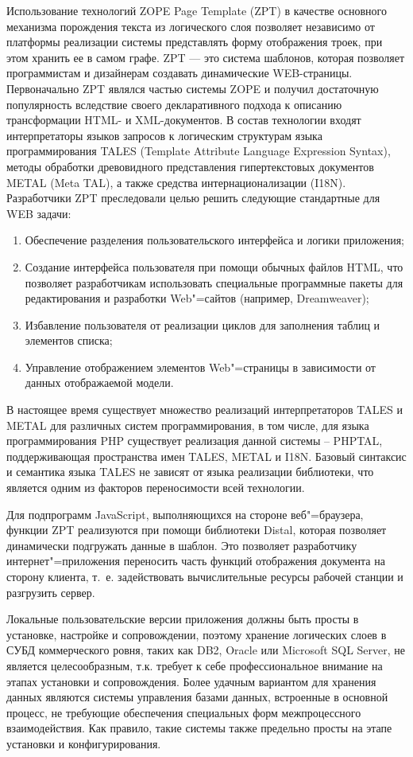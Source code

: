 \documentclass[utf8]{../IncArticle}
\begin{document}
Использование технологий ZOPE Page Template (ZPT) в качестве основного
механизма порождения текста из логического слоя позволяет независимо
от платформы реализации системы представлять форму отображения троек,
при этом хранить ее в самом графе.  ZPT --- это система шаблонов,
которая позволяет программистам и дизайнерам создавать динамические
WEB-страницы.  Первоначально ZPT являлся частью системы ZOPE и получил
достаточную популярность вследствие своего декларативного подхода к
описанию трансформации HTML- и XML-документов.  В состав технологии
входят интерпретаторы языков запросов к логическим структурам языка
программирования TALES (Template Attribute Language Expression
Syntax), методы обработки древовидного представления гипертекстовых
документов METAL (Meta TAL), а также средства интернационализации
(I18N).  Разработчики ZPT преследовали целью решить следующие
стандартные для WEB задачи:
\begin{enumerate}
\item Обеспечение разделения пользовательского интерфейса и логики
  приложения;
\item Создание интерфейса пользователя при помощи обычных файлов
  HTML, что позволяет разработчикам использовать специальные
  программные пакеты для редактирования и разработки Web"=сайтов
  (например, Dreamweaver);
\item Избавление пользователя от реализации циклов для заполнения
  таблиц и элементов списка;
\item Управление отображением элементов Web"=страницы в зависимости от
  данных отображаемой модели.
\end{enumerate}

В настоящее время существует множество реализаций интерпретаторов
TALES и METAL для различных систем программирования, в том числе, для
языка программирования PHP существует реализация данной системы –
PHPTAL, поддерживающая пространства имен TALES, METAL и I18N.  Базовый
синтаксис и семантика языка TALES не зависят от языка
реализации библиотеки, что является одним из факторов переносимости
всей технологии.

Для подпрограмм JavaScript, выполняющихся на стороне веб"=браузера,
функции ZPT реализуются при помощи библиотеки Distal, которая
позволяет динамически подгружать данные в шаблон.  Это позволяет
разработчику интернет"=приложения переносить часть функций отображения
документа на сторону клиента, т.~е. задействовать вычислительные
ресурсы рабочей станции и разгрузить сервер.

Локальные пользовательские версии приложения должны быть просты в
установке, настройке и сопровождении, поэтому хранение логических
слоев в СУБД коммерческого ровня, таких как DB2, Oracle или Microsoft
SQL Server, не является целесообразным, т.к. требует к себе
профессиональное внимание на этапах установки и сопровождения.  Более
удачным вариантом для хранения данных являются системы управления
базами данных, встроенные в основной процесс, не требующие обеспечения
специальных форм межпроцессного взаимодействия.  Как правило, такие
системы также предельно просты на этапе установки и конфигурирования.
\end{document}
